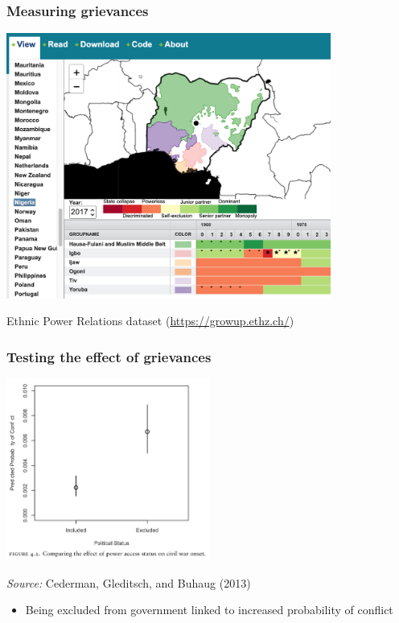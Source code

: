 \documentclass[utf8, xcolor=dvipsnames]{beamer}
\begin{document}
\begin{frame}
\frametitle{Measuring grievances}
\centering

\includegraphics[width = 0.8\textwidth]{img/epr_nigeria}

\vspace{10pt}

{\small Ethnic Power Relations dataset (\url{https://growup.ethz.ch/})}

\end{frame}

\begin{frame}
\frametitle{Testing the effect of grievances}
\centering

\includegraphics[width = 0.5\textwidth]{img/cgb_effect_exclusion}

\vspace{10pt}

{\small \textit{Source:} Cederman, Gleditsch, and Buhaug (2013)}

\vspace{15pt}

\begin{itemize}
  \item Being excluded from government linked to increased probability of conflict
\end{itemize}

\end{frame}
\end{document}
